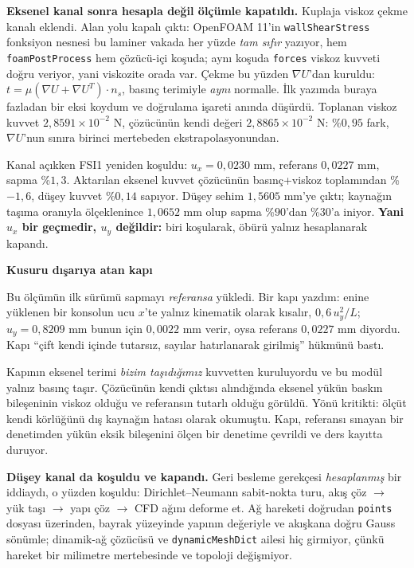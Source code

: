 \documentclass[11pt,a4paper]{article}
\newcommand{\kkkenar}{lacivert}
\newcommand{\kkzemin}{kod}
\newenvironment{renkkutu}[3]{%
  \renewcommand{\kkkenar}{#1}\renewcommand{\kkzemin}{#2}%
  \par\medskip\noindent
  \begin{lrbox}{\kutugovde}%
  \begin{minipage}{\dimexpr\linewidth-2\fboxsep-2\fboxrule\relax}\footnotesize
  \textcolor{#1}{\textbf{#3}}\par\vspace{3pt}%
}{%
  \end{minipage}%
  \end{lrbox}%
  \noindent\fcolorbox{\kkkenar}{\kkzemin}{\usebox{\kutugovde}}%
  \par\medskip
}
\newenvironment{dikkat}[1]{\begin{renkkutu}{orta}{ortabg}{#1}}{\end{renkkutu}}
\begin{document}
\begin{description}
        \medskip
        \noindent \textbf{Eksenel kanal sonra hesapla değil ölçümle
        kapatıldı.} Kuplaja viskoz çekme kanalı eklendi. Alan yolu kapalı
        çıktı: OpenFOAM 11'in \texttt{wallShearStress} fonksiyon nesnesi bu
        laminer vakada her yüzde \emph{tam sıfır} yazıyor, hem
        \texttt{foamPostProcess} hem çözücü-içi koşuda; aynı koşuda
        \texttt{forces} viskoz kuvveti doğru veriyor, yani viskozite orada
        var. Çekme bu yüzden $\nabla U$'dan kuruldu:
        $t = \mu (\nabla U + \nabla U^{T})\cdot n_s$, basınç terimiyle
        \emph{aynı} normalle. İlk yazımda buraya fazladan bir eksi koydum ve
        doğrulama işareti anında düşürdü. Toplanan viskoz kuvvet
        $2{,}8591{\times}10^{-2}$ N, çözücünün kendi değeri
        $2{,}8865{\times}10^{-2}$ N: \%$0{,}95$ fark, $\nabla U$'nun sınıra
        birinci mertebeden ekstrapolasyonundan.

        \noindent Kanal açıkken FSI1 yeniden koşuldu:
        $u_x = 0{,}0230$ mm, referans $0{,}0227$ mm, sapma \%$1{,}3$.
        Aktarılan eksenel kuvvet çözücünün basınç+viskoz toplamından
        \%$-1{,}6$, düşey kuvvet \%$0{,}14$ sapıyor. Düşey sehim
        $1{,}5605$ mm'ye çıktı; kaynağın taşıma oranıyla ölçeklenince
        $1{,}0652$ mm olup sapma \%$90$'dan \%$30$'a iniyor.
        \textbf{Yani $u_x$ bir geçmedir, $u_y$ değildir:} biri koşularak,
        öbürü yalnız hesaplanarak kapandı.

        \begin{dikkat}{Kusuru dışarıya atan kapı}
        Bu ölçümün ilk sürümü sapmayı \emph{referansa} yükledi. Bir kapı
        yazdım: enine yüklenen bir konsolun ucu $x$'te yalnız kinematik
        olarak kısalır, $0{,}6\,u_y^2/L$; $u_y = 0{,}8209$ mm bunun için
        $0{,}0022$ mm verir, oysa referans $0{,}0227$ mm diyordu. Kapı
        ``çift kendi içinde tutarsız, sayılar hatırlanarak girilmiş''
        hükmünü bastı.

        Kapının eksenel terimi \emph{bizim taşıdığımız} kuvvetten
        kuruluyordu ve bu modül yalnız basınç taşır. Çözücünün kendi
        çıktısı alındığında eksenel yükün baskın bileşeninin viskoz olduğu
        ve referansın tutarlı olduğu görüldü. Yönü kritikti: ölçüt kendi
        körlüğünü dış kaynağın hatası olarak okumuştu. Kapı, referansı
        sınayan bir denetimden yükün eksik bileşenini ölçen bir denetime
        çevrildi ve ders kayıtta duruyor.
        \end{dikkat}

        \medskip
        \medskip
        \noindent \textbf{Düşey kanal da koşuldu ve kapandı.} Geri besleme
        gerekçesi \emph{hesaplanmış} bir iddiaydı, o yüzden koşuldu:
        Dirichlet--Neumann sabit-nokta turu, akış çöz $\to$ yük taşı $\to$
        yapı çöz $\to$ CFD ağını deforme et. Ağ hareketi doğrudan
        \texttt{points} dosyası üzerinden, bayrak yüzeyinde yapının
        değeriyle ve akışkana doğru Gauss sönümle; dinamik-ağ çözücüsü ve
        \texttt{dynamicMeshDict} ailesi hiç girmiyor, çünkü hareket bir
        milimetre mertebesinde ve topoloji değişmiyor.


\end{description}
\end{document}
